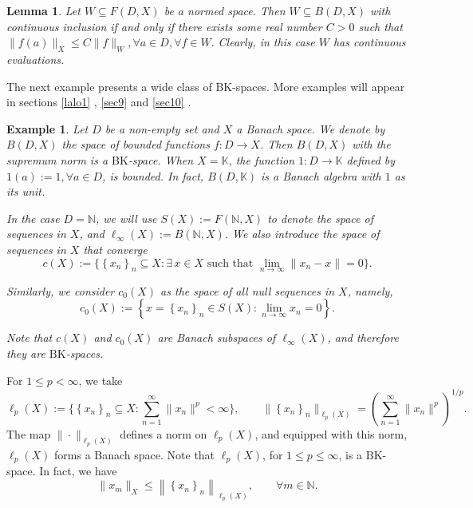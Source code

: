 \documentclass[14pt, a4paper]{article}  %
\providecommand{\llave}[1]{\left\lbrace #1\right\rbrace }
\providecommand{\pare}[1]{\left( #1\right) }
\providecommand{\norm}[1]{\left\lVert#1\right\rVert}
\newcommand{\tien}{\rightarrow}
\newcommand{\K}{\mathbb{K}}
\newcommand{\N}{\mathbb{N}}
\newcommand{\BK}{\text{BK}}
\newtheorem{lemma}{Lemma}[section]
\newtheorem{example}{Example}[section]  %
\begin{document}
\begin{lemma}\label{final11}
	Let $W \subseteq F(D,X)$ be a normed space. Then $W \subseteq B(D,X)$ with continuous inclusion if and only if there exists some real number $C >0$ such that 
	$\| f(a) \|_X \leq C \|f\|_W, \forall a \in D, \forall f \in W.$ 
	Clearly, in this case $W$ has continuous evaluations.
\end{lemma}

	The next example presents a wide class of BK-spaces. More examples will appear in sections \ref{lalo1} , \ref{sec9} and \ref{sec10} .

	  \begin{example}\label{lup1}
	Let $D$ be a non-empty set and $X$ a Banach space. We denote by   $B\pare{D,X}$ the space of bounded functions $f:D\tien X$. Then   $B\pare{D,X}$ with the \emph{supremum norm}  is a $\BK$-space.  When  $X=\K$, the function $\mathit{1}:D\tien \K$   defined by $\mathit{1}\pare{a}:=1,\forall a\in D$,   is bounded. In fact, $B\pare{D,\K}$ is a Banach algebra with $\mathit{1}$ as its unit.
	
	 In the case $D=\N$, we will use $S(X) := F\pare{\N, X}$ to denote the space of sequences in $X$, and $\ell_{\infty}\pare{X} := B\pare{\N, X}$.   We also introduce the space of sequences in $X$ that converge
	\begin{equation}
		c(X) := \Big\{ \llave{x_{n}}_{n} \subseteq X : \exists\, x \in X \text{ such that } \lim_{n \to \infty} \|x_n - x\| = 0 \Big\}.
	\end{equation}
	
	Similarly, we consider $c_0(X)$ as the space of all null sequences in $X$, namely,
	\begin{equation}
			c_0(X) := \llave{x = \llave{x_{n}}_{n} \in S(X) : \lim_{n \to \infty} x_n = 0}.
	\end{equation}
	
	Note that $c(X)$ and $c_0(X)$ are Banach subspaces of $\ell_{\infty}\pare{X}$, and therefore they are $\BK$-spaces.
	
\end{example} 

  For $1 \leq p < \infty$, we take
\begin{equation}
	\ell_p(X) := \Big\{ \llave{x_{n}}_{n} \subseteq X : \sum_{n=1}^{\infty} \|x_n\|^p < \infty \Big\}, \qquad
	\|\llave{x_{n}}_{n}\|_{\ell_p(X)} = \pare{ \sum_{n=1}^{\infty} \|x_n\|^p }^{1/p}.
\end{equation}
The map $\|\cdot\|_{\ell_p(X)}$ defines a norm on $\ell_p(X)$, and equipped with this norm, $\ell_p(X)$ forms a Banach space.  Note that  $\ell_{p}\pare{X}$, for $1 \leq p \leq \infty$, is a $\BK$-space. In fact, we have
\begin{equation}
	\|x_m \|_{X} \leq \norm{\llave{x_{n}}_{n}}_{\ell_p(X)},\qquad  \forall m \in \N.
\end{equation}
\end{document}
